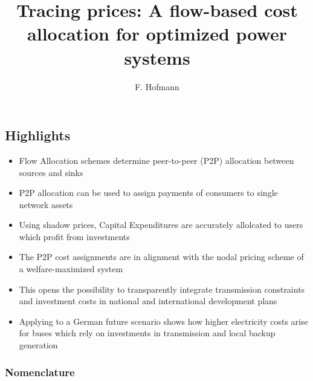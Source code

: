 \documentclass[11pt,twocolumn]{article}
\begin{document}
\title{Tracing prices: A flow-based cost allocation for optimized power systems}
\author{F. Hofmann}

\maketitle

\begin{abstract}
\end{abstract}


\subsection*{Highlights}
\begin{itemize}
 \item Flow Allocation schemes determine peer-to-peer (P2P) allocation between sources and sinks 
 \item P2P allocation can be used to assign payments of consumers to single network assets
 \item Using shadow prices, Capital Expenditures are accurately allolcated to users which profit from investments
 \item The P2P cost assignments are in alignment with the nodal pricing scheme of a welfare-maximized system   
 \item This opens the possibility to transparently integrate transmission constraints and investment costs in national and international development plans 
 \item Applying to a German future scenario shows how higher electricity costs arise for buses which rely on investments in transmission and local backup generation  
\end{itemize}


\subsubsection*{Nomenclature}
\end{document}
